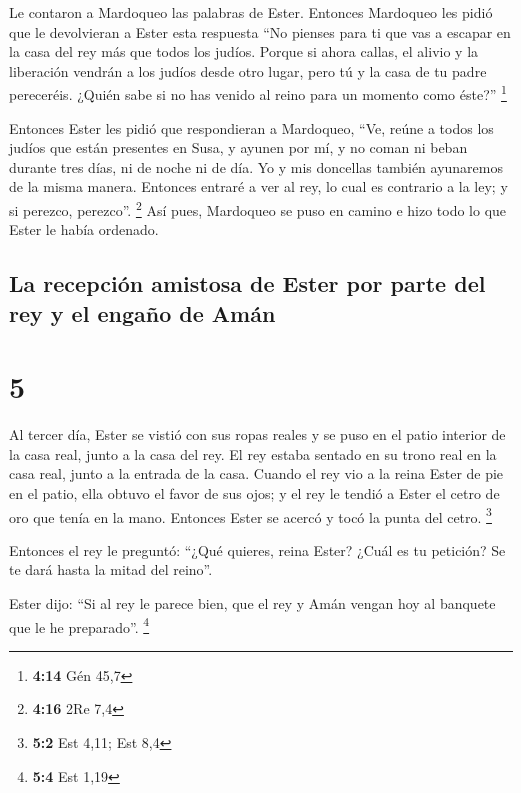  Le contaron a Mardoqueo las palabras de Ester.
 Entonces Mardoqueo les pidió que le devolvieran a Ester
esta respuesta ``No pienses para ti que vas a escapar en la casa del rey
más que todos los judíos.  Porque si ahora callas, el
alivio y la liberación vendrán a los judíos desde otro lugar, pero tú y
la casa de tu padre pereceréis. ¿Quién sabe si no has venido al reino
para un momento como éste?'' \footnote{\textbf{4:14} Gén 45,7}

 Entonces Ester les pidió que respondieran a Mardoqueo,
 ``Ve, reúne a todos los judíos que están presentes en
Susa, y ayunen por mí, y no coman ni beban durante tres días, ni de
noche ni de día. Yo y mis doncellas también ayunaremos de la misma
manera. Entonces entraré a ver al rey, lo cual es contrario a la ley; y
si perezco, perezco''. \footnote{\textbf{4:16} 2Re 7,4} 
Así pues, Mardoqueo se puso en camino e hizo todo lo que Ester le había
ordenado.

\hypertarget{la-recepciuxf3n-amistosa-de-ester-por-parte-del-rey-y-el-engauxf1o-de-amuxe1n}{%
\subsection{La recepción amistosa de Ester por parte del rey y el engaño
de
Amán}\label{la-recepciuxf3n-amistosa-de-ester-por-parte-del-rey-y-el-engauxf1o-de-amuxe1n}}

\hypertarget{section-4}{%
\section{5}\label{section-4}}

 Al tercer día, Ester se vistió con sus ropas reales y se
puso en el patio interior de la casa real, junto a la casa del rey. El
rey estaba sentado en su trono real en la casa real, junto a la entrada
de la casa.  Cuando el rey vio a la reina Ester de pie en
el patio, ella obtuvo el favor de sus ojos; y el rey le tendió a Ester
el cetro de oro que tenía en la mano. Entonces Ester se acercó y tocó la
punta del cetro. \footnote{\textbf{5:2} Est 4,11; Est 8,4}

 Entonces el rey le preguntó: ``¿Qué quieres, reina Ester?
¿Cuál es tu petición? Se te dará hasta la mitad del reino''.

 Ester dijo: ``Si al rey le parece bien, que el rey y Amán
vengan hoy al banquete que le he preparado''. \footnote{\textbf{5:4} Est
  1,19}

